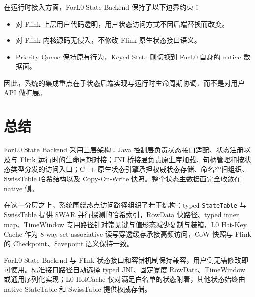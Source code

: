 \documentclass[a4paper,11pt]{article}
\newcommand{\project}{ForL0 State Backend}
\begin{document}
在运行时接入方面，\project{} 保持了以下边界约束：

\begin{itemize}
  \item 对 Flink 上层用户代码透明，用户状态访问方式不因后端替换而改变。
  \item 对 Flink 内核源码无侵入，不修改 Flink 原生状态接口语义。
  \item Priority Queue 保持原有行为，Keyed State 则切换到 ForL0 自身的 native 数据面。
\end{itemize}

因此，系统的集成重点在于状态后端实现与运行时生命周期协调，而不是对用户 API 做扩展。

\section{总结}

\project{} 采用三层架构：Java 控制层负责状态接口适配、状态注册以及与 Flink 运行时的生命周期对接；JNI 桥接层负责原生库加载、句柄管理和按状态类型分发的访问入口；C++ 原生状态引擎承担权威状态存储、命名空间组织、SwissTable 哈希结构以及 Copy-On-Write 快照。整个状态主数据面完全收敛在 native 侧。

在这一分层之上，系统围绕热点访问路径组织了若干结构：typed \texttt{StateTable} 与 SwissTable 提供 SWAR 并行探测的哈希索引，RowData 快路径、typed inner map、TimeWindow 专用路径针对常见键与值形态减少复制与装箱，L0 Hot-Key Cache 作为 8-way set-associative 读写穿透缓存承接高频访问，CoW 快照与 Flink 的 Checkpoint、Savepoint 语义保持一致。

\project{} 与 Flink 状态接口和容错机制保持兼容，用户侧无需修改即可使用。标准接口路径自动选择 typed JNI、固定宽度 RowData、TimeWindow 或通用序列化实现；L0 HotCache 仅对满足白名单的状态附着，其他状态始终由 native StateTable 和 SwissTable 提供权威存储。
\end{document}
